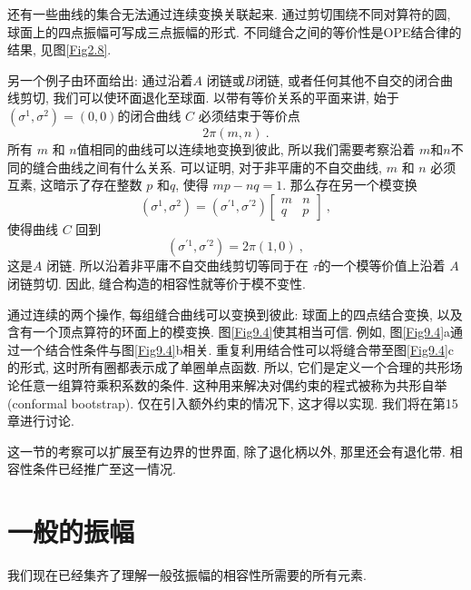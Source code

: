 还有一些曲线的集合无法通过连续变换关联起来. 通过剪切围绕不同对算符的圆, 球面上的四点振幅可写成三点振幅的形式. 不同缝合之间的等价性是OPE结合律的结果, 
见图\ref{Fig2.8}.

另一个例子由环面给出: 通过沿着$A$ 闭链或$B$闭链, 或者任何其他不自交的闭合曲线剪切, 我们可以使环面退化至球面. 
以带有等价关系的平面来讲, 始于 $(\sigma^{1}, \sigma^{2})=(0,0)$的闭合曲线 $C$ 必须结束于等价点
\begin{equation}
	2 \pi(m, n) \:. \label{9.4.10}
\end{equation}
所有 $m$ 和 $n$值相同的曲线可以连续地变换到彼此, 所以我们需要考察沿着 $m$和$n $不同的缝合曲线之间有什么关系. 
可以证明, 对于非平庸的不自交曲线, $m$ 和 $n$ 必须互素, 这暗示了存在整数 $p$ 和$q$, 使得 $m p-n q=1$. 那么存在另一个模变换
\begin{equation}
	(\sigma^{1}, \sigma^{2}) = (\sigma^{\prime 1}, \sigma^{\prime 2}) \begin{bmatrix}
		m & n \\
		q & p		
	\end{bmatrix} \:, \label{9.4.11}
\end{equation}
使得曲线 $C$ 回到
\begin{equation}
	(\sigma^{\prime 1}, \sigma^{\prime 2})=2 \pi(1,0) \:, \label{9.4.12}
\end{equation}
这是$A$ 闭链. 所以沿着非平庸不自交曲线剪切等同于在 $\tau $的一个模等价值上沿着 $A$ 闭链剪切. 因此, 缝合构造的相容性就等价于模不变性.

通过连续的两个操作, 每组缝合曲线可以变换到彼此: 球面上的四点结合变换, 以及含有一个顶点算符的环面上的模变换. 图\ref{Fig9.4}使其相当可信. 
例如, 图\ref{Fig9.4}a通过一个结合性条件与图\ref{Fig9.4}b相关. 重复利用结合性可以将缝合带至图\ref{Fig9.4}c的形式, 这时所有圈都表示成了单圈单点函数. 
所以, 它们是定义一个合理的共形场论任意一组算符乘积系数的条件. 这种用来解决对偶约束的程式被称为共形自举(conformal bootstrap). 
仅在引入额外约束的情况下, 这才得以实现. 我们将在第15章进行讨论.

这一节的考察可以扩展至有边界的世界面, 除了退化柄以外, 那里还会有退化带. 相容性条件已经推广至这一情况.

\section{一般的振幅}  \label{sec:9.5}%
我们现在已经集齐了理解一般弦振幅的相容性所需要的所有元素. 

